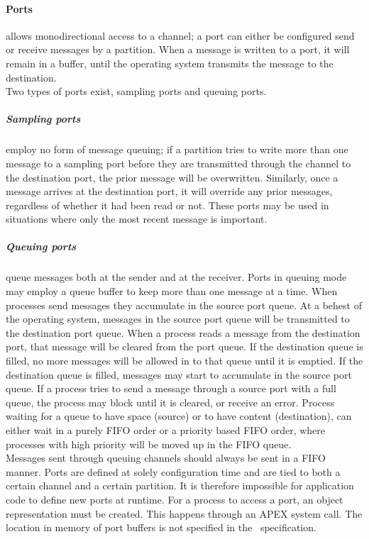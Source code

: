 \paragraph{Ports} allows monodirectional access to a channel;
a port can either be configured send or receive messages by a partition.
When a message is written to a port, it will remain in a buffer, until the operating system transmits the message to the destination.\\

Two types of ports exist, sampling ports and queuing ports. 
\subparagraph{Sampling ports} employ no form of message queuing; if a partition tries to write more than one message to a sampling port
before they are transmitted through the channel to the destination port, the prior message will be overwritten. Similarly, once a message arrives at the destination port,
it will override any prior messages, regardless of whether it had been read or not. These ports may be used in situations where only the most recent message is important.
\subparagraph{Queuing ports} queue messages both at the sender and at the receiver. Ports in queuing mode may employ a queue buffer to keep more than one message at a time.
When processes send messages they accumulate in the source port queue. At a behest of the operating system, messages in the source port queue will be transmitted to the destination port queue.
When a process reads a message from the destination port, that message will be cleared from the port queue. If the destination queue is filled, no more messages will be allowed
in to that queue until it is emptied. If the destination queue is filled, messages may start to accumulate in the source port queue. If a process tries to send a message through a
source port with a full queue, the process may block until it is cleared, or receive an error.
Process waiting for a queue to have space (source) or to have content (destination), can either wait in a purely FIFO order or a priority based FIFO order, where processes with high priority
will be moved up in the FIFO queue.\\

Messages sent through queuing channels should always be sent in a FIFO manner.
Ports are defined at solely configuration time and are tied to both a certain channel and a certain partition.
It is therefore impossible for application code to define new ports at runtime. 
For a process to access a port, an object representation must be created. This happens through an APEX system call.
The location in memory of port buffers is not specified in the \arinc\ specification.

